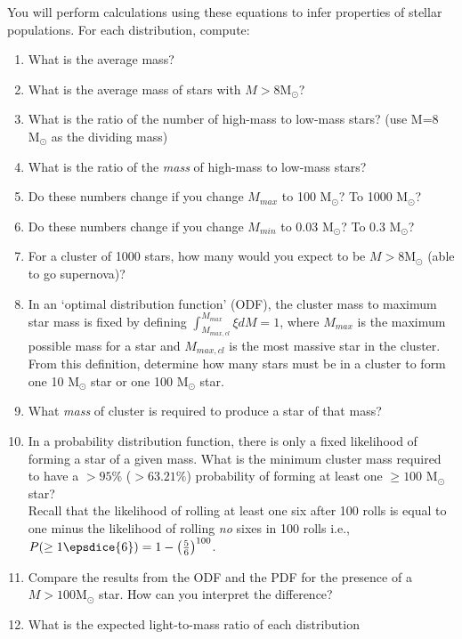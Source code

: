 \documentclass{article}
\newcommand{\msun}{\ensuremath{\mathrm{M}_\odot}\xspace}
\begin{document}
\begin{enumerate}
    You will perform calculations using these equations to infer properties of stellar
    populations.  For each distribution, compute:
    \begin{enumerate}
        \item What is the average mass?
        \item What is the average mass of stars with $M>8\msun$?
        \item What is the ratio of the number of high-mass to low-mass stars?
            (use M=8 \msun as the dividing mass)
        \item What is the ratio of the \emph{mass} of high-mass to low-mass stars?
        \item Do these numbers change if you change $M_{max}$ to 100 \msun?  To 1000 \msun?
        \item Do these numbers change if you change $M_{min}$ to 0.03 \msun?  To 0.3 \msun?
        \item For a cluster of 1000 stars, how many would you expect to be
            $M>8\msun$ (able to go supernova)?
        \item In an `optimal distribution function' (ODF), the cluster mass to maximum star mass
            is fixed by defining $\int_{M_{max,cl}}^{M_{max}} \xi dM = 1$,
            where $M_{max}$ is the maximum possible mass for a star and $M_{max,cl}$ is
            the most massive star in the cluster.
            From this definition, determine how many stars must be in a cluster
            to form one 10 \msun star or one 100 \msun star.
        \item What \emph{mass} of cluster is required to produce a star of that mass?
        \item In a probability distribution function, there is only a fixed likelihood
            of forming a star of a given mass.  What is the minimum cluster mass
            required to have a $>95\%$ ($>63.21\%$) probability of forming at least one $\geq100$
            \msun star?\\
            Recall that the likelihood of rolling at least one six after 100 rolls
            is equal to one minus the likelihood of rolling \emph{no} sixes in 100 rolls
            i.e., $P(\ge 1 \epsdice{6}) = 1- \left(\frac{5}{6}\right)^{100}$.
        \item Compare the results from the ODF and the PDF for the presence of
            a $M>100\msun$ star.  How can you interpret the difference?
        \item What is the expected light-to-mass ratio of each distribution

\end{enumerate}
\end{enumerate}
\end{document}
